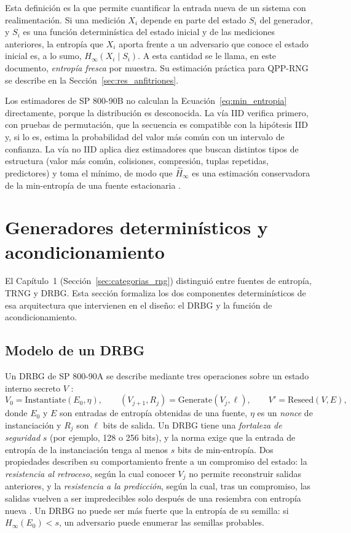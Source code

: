 Esta definición es la que permite cuantificar la entrada nueva de un sistema con realimentación. Si una medición $X_i$ depende en parte del estado $S_i$ del generador, y $S_i$ es una función determinística del estado inicial y de las mediciones anteriores, la entropía que $X_i$ aporta frente a un adversario que conoce el estado inicial es, a lo sumo, $H_\infty(X_i \mid S_i)$. A esta cantidad se le llama, en este documento, \emph{entropía fresca} por muestra. Su estimación práctica para QPP-RNG se describe en la Sección~\ref{sec:res_anfitriones}.

Los estimadores de SP 800-90B no calculan la Ecuación~\eqref{eq:min_entropia} directamente, porque la distribución es desconocida. La vía IID verifica primero, con pruebas de permutación, que la secuencia es compatible con la hipótesis IID y, si lo es, estima la probabilidad del valor más común con un intervalo de confianza. La vía no IID aplica diez estimadores que buscan distintos tipos de estructura (valor más común, colisiones, compresión, tuplas repetidas, predictores) y toma el mínimo, de modo que $\hat{H}_\infty$ es una estimación conservadora de la min-entropía de una fuente estacionaria \cite{Turan2018RecommendationGeneration}.

\section{Generadores determinísticos y acondicionamiento}
\label{sec:generadores_rng}

El Capítulo~1 (Sección~\ref{sec:categorias_rng}) distinguió entre fuentes de entropía, TRNG y DRBG. Esta sección formaliza los dos componentes determinísticos de esa arquitectura que intervienen en el diseño: el DRBG y la función de acondicionamiento.

\subsection{Modelo de un DRBG}

Un DRBG de SP 800-90A se describe mediante tres operaciones sobre un estado interno secreto $V$ \cite{Barker2015RecommendationGenerators}:
\begin{equation}
    V_0 = \text{Instantiate}(E_0, \eta), \qquad (V_{j+1}, R_j) = \text{Generate}(V_j, \ell), \qquad V' = \text{Reseed}(V, E),
\end{equation}
donde $E_0$ y $E$ son entradas de entropía obtenidas de una fuente, $\eta$ es un \textit{nonce} de instanciación y $R_j$ son $\ell$ bits de salida. Un DRBG tiene una \emph{fortaleza de seguridad} $s$ (por ejemplo, 128 o 256 bits), y la norma exige que la entrada de entropía de la instanciación tenga al menos $s$ bits de min-entropía. Dos propiedades describen su comportamiento frente a un compromiso del estado: la \emph{resistencia al retroceso}, según la cual conocer $V_j$ no permite reconstruir salidas anteriores, y la \emph{resistencia a la predicción}, según la cual, tras un compromiso, las salidas vuelven a ser impredecibles solo después de una resiembra con entropía nueva \cite{Barker2015RecommendationGenerators,Dodis2013NotRobust}. Un DRBG no puede ser más fuerte que la entropía de su semilla: si $H_\infty(E_0) < s$, un adversario puede enumerar las semillas probables.

